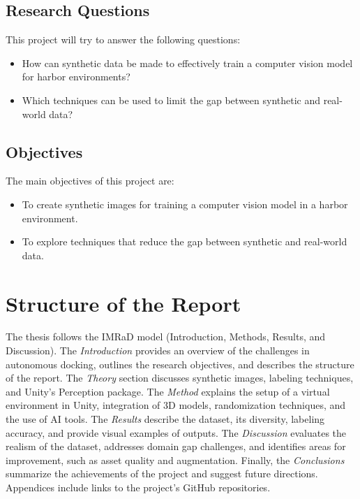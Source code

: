 \subsection{Research Questions}
This project will try to answer the following questions:
\begin{itemize}
    \item How can synthetic data be made to effectively train a computer vision model for harbor environments?
    \item Which techniques can be used to limit the gap between synthetic and real-world data?
    
\end{itemize}

\subsection{Objectives}
The main objectives of this project are:
\begin{itemize}
    \item To create synthetic images for training a computer vision model in a harbor environment.
    \item To explore techniques that reduce the gap between synthetic and real-world data.
\end{itemize}


\section{Structure of the Report}

The thesis follows the IMRaD model (Introduction, Methods, Results, and Discussion). The \textit{Introduction} provides an overview of the challenges in autonomous docking, outlines the research objectives, and describes the structure of the report. The \textit{Theory} section discusses synthetic images, labeling techniques, and Unity's Perception package. The \textit{Method} explains the setup of a virtual environment in Unity, integration of 3D models, randomization techniques, and the use of AI tools. The \textit{Results} describe the dataset, its diversity, labeling accuracy, and provide visual examples of outputs. The \textit{Discussion} evaluates the realism of the dataset, addresses domain gap challenges, and identifies areas for improvement, such as asset quality and augmentation. Finally, the \textit{Conclusions} summarize the achievements of the project and suggest future directions.\\


\noindent Appendices include links to the project's GitHub repositories.
